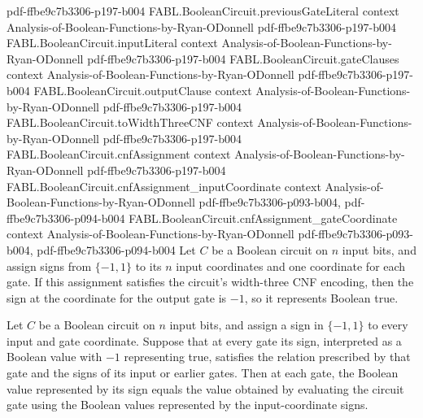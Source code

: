 \begin{theorem}
  {pdf-ffbe9c7b3306-p197-b004}
\proofstep
  {FABL.BooleanCircuit.previousGateLiteral}
  {context}
  {Analysis-of-Boolean-Functions-by-Ryan-ODonnell}
  {pdf-ffbe9c7b3306-p197-b004}
\proofstep
  {FABL.BooleanCircuit.inputLiteral}
  {context}
  {Analysis-of-Boolean-Functions-by-Ryan-ODonnell}
  {pdf-ffbe9c7b3306-p197-b004}
\proofstep
  {FABL.BooleanCircuit.gateClauses}
  {context}
  {Analysis-of-Boolean-Functions-by-Ryan-ODonnell}
  {pdf-ffbe9c7b3306-p197-b004}
\proofstep
  {FABL.BooleanCircuit.outputClause}
  {context}
  {Analysis-of-Boolean-Functions-by-Ryan-ODonnell}
  {pdf-ffbe9c7b3306-p197-b004}
\proofstep
  {FABL.BooleanCircuit.toWidthThreeCNF}
  {context}
  {Analysis-of-Boolean-Functions-by-Ryan-ODonnell}
  {pdf-ffbe9c7b3306-p197-b004}
\proofstep
  {FABL.BooleanCircuit.cnfAssignment}
  {context}
  {Analysis-of-Boolean-Functions-by-Ryan-ODonnell}
  {pdf-ffbe9c7b3306-p197-b004}
\proofstep
  {FABL.BooleanCircuit.cnfAssignment_inputCoordinate}
  {context}
  {Analysis-of-Boolean-Functions-by-Ryan-ODonnell}
  {pdf-ffbe9c7b3306-p093-b004,
    pdf-ffbe9c7b3306-p094-b004}
\proofstep
  {FABL.BooleanCircuit.cnfAssignment_gateCoordinate}
  {context}
  {Analysis-of-Boolean-Functions-by-Ryan-ODonnell}
  {pdf-ffbe9c7b3306-p093-b004,
    pdf-ffbe9c7b3306-p094-b004}
Let $C$ be a Boolean circuit on $n$ input bits, and assign signs from $\{-1,1\}$ to its
$n$ input coordinates and one coordinate for each gate. If this assignment satisfies the
circuit's width-three CNF encoding, then the sign at the coordinate for the output gate
is $-1$, so it represents Boolean true.
\end{theorem}

\begin{theorem}
\label{FABL.BooleanCircuit.gateValue_eq_evalGate}
\leanok
{}
Let $C$ be a Boolean circuit on $n$ input bits, and assign a sign in $\{-1,1\}$ to every
input and gate coordinate. Suppose that at every gate its sign, interpreted as a Boolean
value with $-1$ representing true, satisfies the relation prescribed by that gate and
the signs of its input or earlier gates. Then at each gate, the Boolean value
represented by its sign equals the value obtained by evaluating the circuit gate using
the Boolean values represented by the input-coordinate signs.
\end{theorem}

